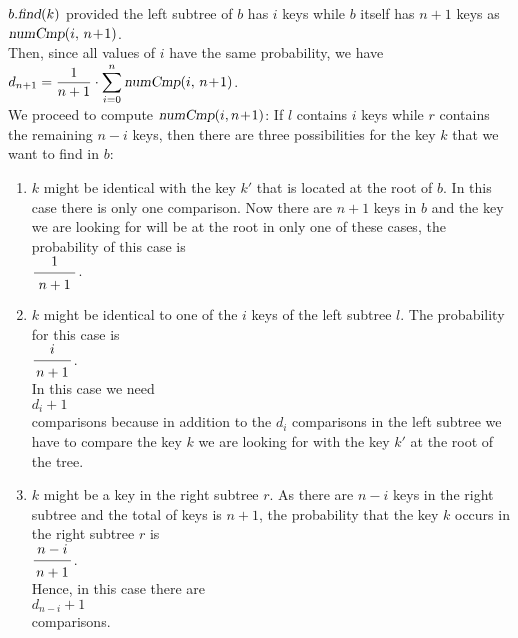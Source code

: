 $b.\textsl{find}(k)$ provided the left subtree of $b$ has $i$ keys while $b$ itself has $n+1$ keys
as
\\[0.2cm]
\hspace*{1.3cm}
$\textsl{numCmp}(i,\, n\!+\!1)$.
\\[0.2cm]
Then, since all values of $i$ have the same probability, we have
\\[0.2cm]
\hspace*{1.3cm}
$\displaystyle d_{n+1} =  \frac{1}{n+1} \cdot \sum\limits_{i=0}^n \textsl{numCmp}(i,\, n\!+\!1)$.
\\[0.2cm]
We proceed to compute $\textsl{numCmp}(i,n\!+\!1)$:
If  $l$ contains $i$ keys while $r$ contains the remaining $n-i$ keys,
then there are three possibilities for the key $k$ that we want to find in $b$:
\begin{enumerate}
\item $k$ might be identical with the key $k'$ that is located at the root of $b$.
      In this case there is only one comparison.
      Now there  are $n+1$ keys in $b$ and the key we are looking for will be at the root in only
      one of these cases, the probability of this case is
      \\[0.2cm]
      \hspace*{1.3cm} $\bruch{1}{\,n+1\,}$.

\item $k$ might be identical to one of the  $i$ keys of the left subtree $l$.
      The probability for this case is 
      \\[0.2cm]
      \hspace*{1.3cm} $\displaystyle\bruch{i}{n+1}$. \\[0.2cm]
      In this case we need 
      \\[0.2cm]
      \hspace*{1.3cm} $\displaystyle d_i + 1$ \\[0.2cm]
      comparisons because in addition to the  $d_i$ comparisons in the left subtree we have to
      compare the key $k$ we are looking for with the key $k'$ at the root of the tree.
\item $k$ might be a key in the right subtree $r$.  As there are  $n-i$ keys in the right subtree
      and the total of keys is $n+1$, the probability that the key  $k$ occurs in the right subtree $r$
      is \\[0.2cm]
      \hspace*{1.3cm} $\displaystyle \bruch{n-i}{n+1}$. \\[0.2cm]
      Hence, in this case there are  \\[0.2cm]
      \hspace*{1.3cm} $\displaystyle d_{n-i} + 1$ \\[0.2cm]
      comparisons. 
\end{enumerate}
